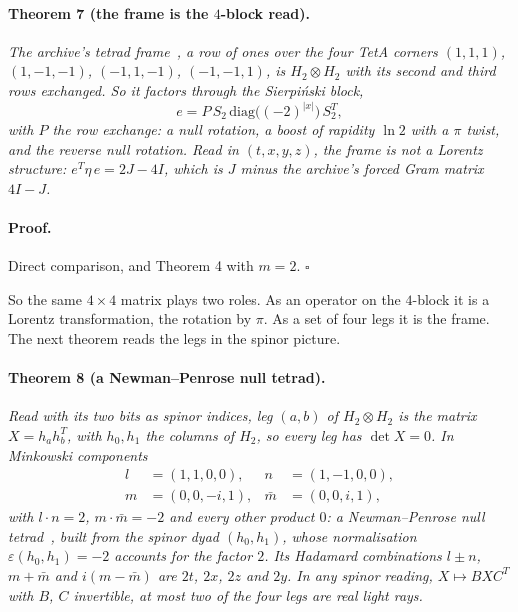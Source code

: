 \documentclass[twocolumn]{iopjournal}
\begin{document}
\paragraph{Theorem 7 (the frame is the $4$-block read).}
\textit{The archive's tetrad frame~\cite{Nelson2026hadamard}, a row of
ones over the four TetA corners $(1,1,1)$, $(1,-1,-1)$, $(-1,1,-1)$,
$(-1,-1,1)$, is $H_2 \otimes H_2$ with its second and third rows
exchanged. So it factors through the Sierpi\'nski block,}
\begin{equation}
  e = P\,S_2\,\mathrm{diag}\big((-2)^{|x|}\big)\,S_2^{T},
\end{equation}
\textit{with $P$ the row exchange: a null rotation, a boost of rapidity
$\ln 2$ with a $\pi$ twist, and the reverse null rotation. Read in
$(t, x, y, z)$, the frame is not a Lorentz structure:
$e^T\eta\,e = 2J - 4I$, which is $J$ minus the archive's forced Gram
matrix $4I - J$.}

\paragraph{Proof.} Direct comparison, and Theorem 4 with $m = 2$.
\hfill $\square$

\medskip
\noindent
So the same $4 \times 4$ matrix plays two roles. As an operator on the
$4$-block it is a Lorentz transformation, the rotation by $\pi$. As a
set of four legs it is the frame. The next theorem reads the legs in
the spinor picture.

\paragraph{Theorem 8 (a Newman--Penrose null tetrad).} \textit{Read
with its two bits as spinor indices, leg $(a, b)$ of
$H_2 \otimes H_2$ is the matrix $X = h_a h_b^T$, with $h_0, h_1$ the
columns of $H_2$, so every leg has $\det X = 0$. In Minkowski
components}
\begin{equation}
\begin{aligned}
  l &= (1, 1, 0, 0), & n &= (1, -1, 0, 0),\\
  m &= (0, 0, -i, 1), & \bar m &= (0, 0, i, 1),
\end{aligned}
\end{equation}
\textit{with $l\cdot n = 2$, $m\cdot\bar m = -2$ and every other
product $0$: a Newman--Penrose null
tetrad~\cite{NewmanPenrose1962}, built from the spinor dyad
$(h_0, h_1)$, whose normalisation $\varepsilon(h_0, h_1) = -2$
accounts for the factor $2$. Its Hadamard combinations $l \pm n$, $m + \bar m$ and
$i(m - \bar m)$ are $2t$, $2x$, $2z$ and $2y$. In any spinor reading,
$X \mapsto BXC^T$ with $B$, $C$ invertible, at most two of the four
legs are real light rays.}
\end{document}
